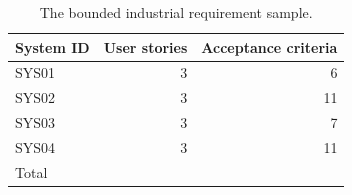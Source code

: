 \begin{table}[t]
\caption{The bounded industrial requirement sample.}
\label{tab:dataset-summary}
\centering
\begin{tabular}{lrr}
\hline
\textbf{System ID} & \textbf{User stories} & \textbf{Acceptance criteria} \\
\hline
SYS01 & 3 & 6 \\
SYS02 & 3 & 11 \\
SYS03 & 3 & 7 \\
SYS04 & 3 & 11 \\
\hline
Total & \StudyStoryCount{} & \StudyCriterionCount{} \\
\hline
\end{tabular}
\end{table}
